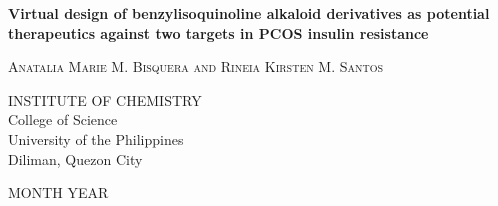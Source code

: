 \begin{singlespace}
	\begin{titlepage}
		\begin{center}
			\fontsize{16pt}{20pt}\selectfont
			
			\vspace*{1cm}
			
			{\textbf{Virtual design of benzylisoquinoline alkaloid derivatives as potential therapeutics against two targets in PCOS insulin resistance}}
			
			\vspace*{5.5cm}
			
			{\textsc{Anatalia Marie M. Bisquera and Rineia Kirsten M. Santos}}
			
			\vspace*{5cm}
			
			{INSTITUTE OF CHEMISTRY\\
				College of Science\\
				University of the Philippines\\
				Diliman, Quezon City}
			
			\vspace{3.5cm}    
			
			MONTH YEAR
		\end{center}
	\end{titlepage}
\end{singlespace}